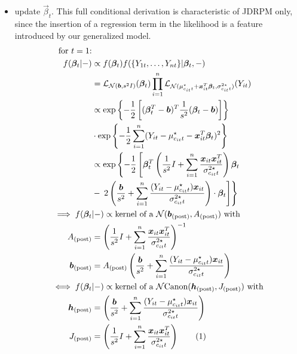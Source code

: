 \documentclass[12pt,	%
	a4paper,		%
	twoside,		%
	openright,		%
	titlepage,%
	]{book}
\theoremstyle{definition}
\begin{document}
\begin{itemize}
\item update $\vec{\beta}_t$. This full conditional derivation is characteristic of JDRPM only, since the insertion of a regression term in the likelihood is a feature introduced by our generalized model.
\begin{align*}
   \text{for $t=1$:}&\\
 f(\vec{\beta}_t|-) & \propto f(\vec{\beta}_t) f(\{ Y_{1t}, \ldots, Y_{nt}\}| \vec{\beta}_t, -)\\
 & = \law_{\N(\vec{b},s^2 I)}(\vec{\beta}_t) \prod_{i=1}^n \law_{ \N(\mu^\star_{c_{it}t} + \vec{x}_{it}^T\vec{\beta}_t,\sigma^{2\star}_{c_{it}t})}(Y_{it}) \\
 & \propto \expp{-\frac{1}{2}\left[ (\vec{\beta}_t^T -\vec{b})^T \frac{1}{s^2} (\vec{\beta}_t-\vec{b}) \right]}
 \\ & \cdot
 \expp{-\frac{1}{2} \sum_{i=1}^n ( Y_{it}-\mu^\star_{c_{it}t} - \vec{x}_{it}^T \vec{\beta}_t )^2}\\
 & \propto \exp \left\{ -\frac{1}{2} \left[ \vec{\beta}_t^T \left( \frac{1}{s^2}I + \sum_{i=1}^n \frac{\vec{x}_{it}\vec{x}_{it}^T}{\sigma^{2\star}_{c_{it}t}}\right)\vec{\beta}_t \right. \right. \\&- \left. \left. 2\left( \frac{\vec{b}}{s^2} +\sum_{i=1}^n \frac{(Y_{it}-\mu^\star_{c_{it}t})\vec{x}_{it}}{\sigma^{2\star}_{c_{it}t}} \right)\cdot \vec{\beta}_t \right] \right\}\\
 \implies f(\vec{\beta}_t&|-) \propto \text{kernel of a $\N(\vec{b}_\post, A_\post)$ with}\\
 A_\post & = \left( \frac{1}{s^2}I + \sum_{i=1}^n \frac{\vec{x}_{it}\vec{x}_{it}^T}{\sigma^{2\star}_{c_{it}t}}\right)^{-1} \\
\vec{b}_\post & = A_\post \left( \frac{\vec{b}}{s^2} +\sum_{i=1}^n \frac{(Y_{it}-\mu^\star_{c_{it}t})\vec{x}_{it}}{\sigma^{2\star}_{c_{it}t}} \right) \\
\iff f(\vec{\beta}_t&|-) \propto \text{kernel of a $\Ncan(\vec{h}_\post, J_\post)$ with}\\
\vec{h}_\post & = \left( \frac{\vec{b}}{s^2} +\sum_{i=1}^n \frac{(Y_{it}-\mu^\star_{c_{it}t})\vec{x}_{it}}{\sigma^{2\star}_{c_{it}t}} \right) \\
J_\post & = \left( \frac{1}{s^2}I + \sum_{i=1}^n \frac{\vec{x}_{it}\vec{x}_{it}^T}{\sigma^{2\star}_{c_{it}t}}\right)
\tag{\stepcounter{equation}\theequation}
\end{align*}
\begin{align*}

\end{align*}
\end{itemize}
\end{document}
